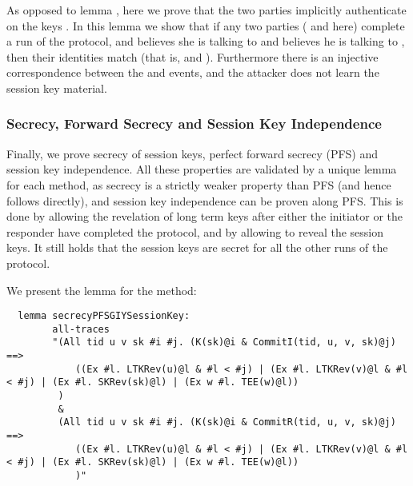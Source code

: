As opposed to lemma , here we prove that the two
parties implicitly authenticate on the keys . %
In this lemma we show that if any two parties ( and  here) complete
a run of the protocol, and  believes she is talking to  and 
believes he is talking to , then their identities match (that is,
 and ). Furthermore there is an injective correspondence
between the  and  events, and the attacker does not
learn the session key material.

 
\subsubsection{Secrecy, Forward Secrecy and Session Key Independence}

Finally, we prove secrecy of session keys, perfect forward secrecy
(PFS) and session key independence.
%
All these properties are validated by a unique lemma for each method,
as secrecy is a strictly weaker property than PFS (and hence follows
directly), and session key independence can be proven along PFS.
%
This is done by allowing the revelation of long term keys after either
the initiator or the responder have completed the protocol, and by
allowing to reveal the session keys.
%
It still holds that the session keys are secret for all the other runs
of the protocol.

We present the lemma for the \mSigStat{} method:
\begin{lstlisting}
  lemma secrecyPFSGIYSessionKey:
        all-traces
        "(All tid u v sk #i #j. (K(sk)@i & CommitI(tid, u, v, sk)@j) ==>
            ((Ex #l. LTKRev(u)@l & #l < #j) | (Ex #l. LTKRev(v)@l & #l < #j) | (Ex #l. SKRev(sk)@l) | (Ex w #l. TEE(w)@l))
         )
         &
         (All tid u v sk #i #j. (K(sk)@i & CommitR(tid, u, v, sk)@j) ==>
            ((Ex #l. LTKRev(u)@l & #l < #j) | (Ex #l. LTKRev(v)@l & #l < #j) | (Ex #l. SKRev(sk)@l) | (Ex w #l. TEE(w)@l))
            )"
\end{lstlisting}

